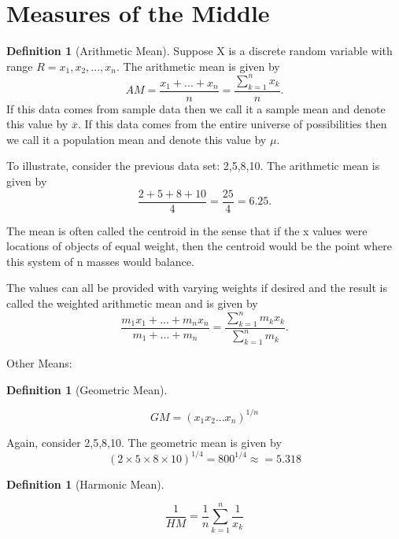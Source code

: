 \documentclass[10pt,]{book}
\theoremstyle{plain}
\theoremstyle{definition}
\newtheorem{definition}[theorem]{Definition}
\theoremstyle{definition}
\theoremstyle{definition}
\numberwithin{equation}{section}
\begin{document}
\section[Measures of the Middle]{Measures of the Middle}\label{section-7}
\begin{definition}[Arithmetic Mean]\label{definition-7}
Suppose X is a discrete random variable with range 
	\(R = {x_1, x_2, ..., x_n}\). 
	The arithmetic mean is given by
		\begin{equation*}
		AM = \frac{x_1 + ... + x_n}{n} = \frac{\sum_{k=1}^n x_k}{n}.
		\end{equation*}
	If this data comes from sample data then we call it a sample mean and denote this value by \(\overline{x}\). If this data comes from the entire universe of possibilities then we call it a population mean and denote this value by \(\mu\).%
\end{definition}

	To illustrate, consider the previous data set: {2,5,8,10}. The arithmetic mean is given by
	\begin{equation*}\frac{2+5+8+10}{4} = \frac{25}{4} = 6.25.\end{equation*}
\par

	The mean is often called the centroid in the sense that if the x values were locations of objects of equal weight, then the centroid
	would be the point where this system of n masses would balance. 
\par

	The values can all be provided with varying weights if desired and the result is called the weighted arithmetic mean and is given by
		\begin{equation*}
		\frac{m_1 x_1 + ... + m_n x_n}{m_1 + ... + m_n} = \frac{\sum_{k=1}^n m_k x_k}{\sum_{k=1}^n m_k}.
		\end{equation*}
\par

Other Means:
%
\begin{definition}[Geometric Mean]\label{definition-8}

	\begin{equation*}GM = (x_1 x_2 ... x_n)^{1/n}\end{equation*}
%
\end{definition}
\par

	Again, consider {2,5,8,10}. The geometric mean is given by
	\begin{equation*}(2 \times 5 \times 8 \times 10)^{1/4} = 800^{1/4} \approx = 5.318\end{equation*}
\begin{definition}[Harmonic Mean]\label{definition-9}

	\begin{equation*}\frac{1}{HM} = \frac{1}{n} \sum_{k=1}^n \frac{1}{x_k}\end{equation*}
%
\end{definition}
\par
\end{document}
